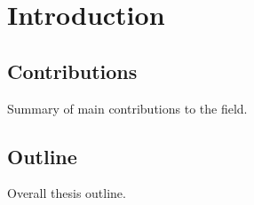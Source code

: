 \chapter{Introduction}

\section{Contributions}

Summary of main contributions to the field.

\section{Outline}

Overall thesis outline.